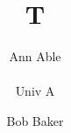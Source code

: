 \documentclass{eptcs}
\title{T}
\author{\begin{tabular}{c}Ann Able\end{tabular}\\ Univ A\and Bob Baker }

\maketitle
Text.

